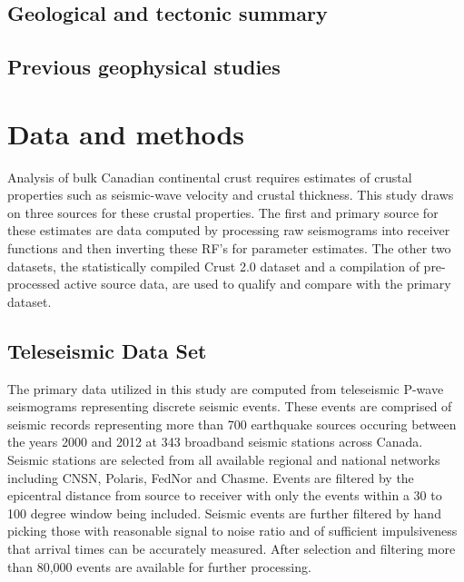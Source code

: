 \documentclass[draft, 12pt]{article}
\begin{document}
\subsection{Geological and tectonic summary}


\subsection{Previous geophysical studies}

\section{Data and methods}
  Analysis of bulk Canadian continental crust requires estimates of crustal properties such as seismic-wave velocity and crustal thickness. This study draws on three sources for these crustal properties. The first and primary source for these estimates are data computed by processing raw seismograms into receiver functions and then inverting these RF's for parameter estimates. The other two datasets, the statistically compiled Crust 2.0 dataset and a compilation of pre-processed active source data, are used to qualify and compare with the primary dataset.

\subsection{Teleseismic Data Set}

  The primary data utilized in this study are computed from teleseismic P-wave seismograms representing discrete seismic events. These events are comprised of seismic records representing more than 700 earthquake sources occuring between the years 2000 and 2012 at 343 broadband seismic stations across Canada. Seismic stations are selected from all available regional and national networks including CNSN, Polaris, FedNor and Chasme. Events are filtered by the epicentral distance from source to receiver with only the events within a 30 to 100 degree window being included. Seismic events are further filtered by hand picking those with reasonable signal to noise ratio and of sufficient impulsiveness that arrival times can be accurately measured. After selection and filtering more than 80,000 events are available for further processing.
\end{document}
